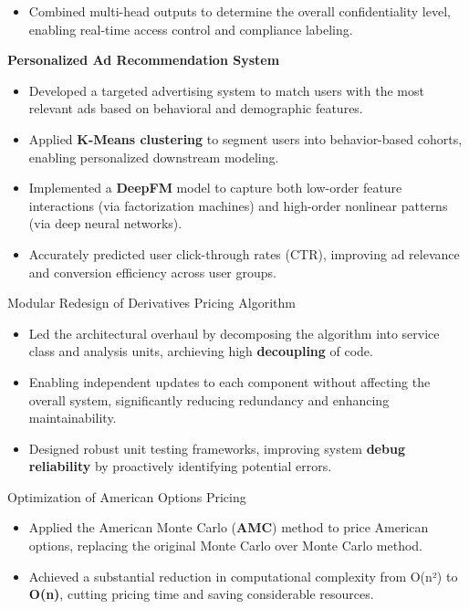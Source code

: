 \begin{cventries}
{\begin{cvitems}
\begin{itemize}
      \item Combined multi-head outputs to determine the overall confidentiality level, enabling real-time access control and compliance labeling.
    \end{itemize}
    \item \textbf{Personalized Ad Recommendation System}
    \begin{itemize}
      \item Developed a targeted advertising system to match users with the most relevant ads based on behavioral and demographic features.
      \item Applied \textbf{K-Means clustering} to segment users into behavior-based cohorts, enabling personalized downstream modeling.
      \item Implemented a \textbf{DeepFM} model to capture both low-order feature interactions (via factorization machines) and high-order nonlinear patterns (via deep neural networks).
      \item Accurately predicted user click-through rates (CTR), improving ad relevance and conversion efficiency across user groups.
    \end{itemize}
    \item Modular Redesign of Derivatives Pricing Algorithm
    \begin{itemize}
      \item Led the architectural overhaul by decomposing the algorithm into service class and analysis units, archieving high \textbf{decoupling} of code.
      \item Enabling independent updates to each component without affecting the overall system, significantly reducing redundancy and enhancing maintainability.
      \item Designed robust unit testing frameworks, improving system \textbf{debug reliability} by proactively identifying potential errors.
    \end{itemize}
    \item Optimization of American Options Pricing
    \begin{itemize}
      \item Applied the American Monte Carlo (\textbf{AMC}) method to price American options, replacing the original Monte Carlo over Monte Carlo method. 
      \item Achieved a substantial reduction in computational complexity from O(n²) to \textbf{O(n)}, cutting pricing time and saving considerable resources.
    \end{itemize}

\end{cvitems}}
\end{cventries}
